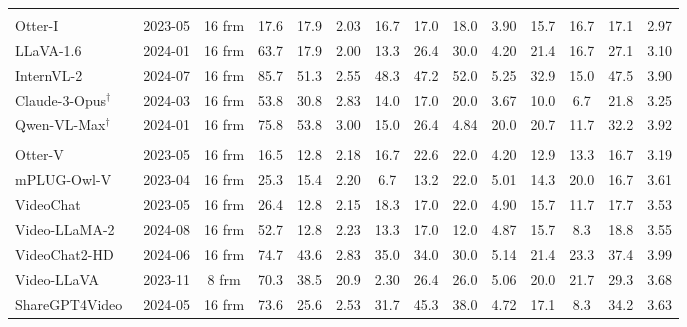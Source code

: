 \begin{table*}[t]
{\begin{tabular}{lccccccccccccc}
\hline
 \rowcolor[HTML]{E3F8F8}\multicolumn{14}{l}{\gray{\textit{\textbf{Image MLLMs}}}}\\
 \rowcolor[HTML]{E3F8F8}  Otter-I~\cite{otter2023} &2023-05 &16 frm  & 17.6 & 17.9 &2.03   & 16.7  & 17.0  & 18.0 &3.90 & 15.7 & 16.7 & 17.1 & 2.97 \\
          \rowcolor[HTML]{E3F8F8}LLaVA-1.6~\cite{llava2023} &2024-01 &16 frm  & 63.7 & 17.9  & 2.00  & 13.3  & 26.4  & 30.0 &4.20   & 21.4 & 16.7 & 27.1 & 3.10 \\
         \rowcolor[HTML]{E3F8F8} InternVL-2~\cite{internvl-1.5-2024} &2024-07 &16 frm & 85.7 & 51.3 & 2.55  & 48.3  & 47.2  & 52.0  & 5.25  & 32.9 & 15.0 & 47.5 & 3.90   \\
         \rowcolor[HTML]{E3F8F8} Claude-3-Opus$^\dag$~\cite{Claude3} &2024-03 &16 frm  & 53.8 & 30.8 & 2.83  & 14.0  & 17.0  & 20.0  & 3.67  & 10.0 & 6.7  & 21.8 & 3.25  \\
        \rowcolor[HTML]{E3F8F8} Qwen-VL-Max$^\dag$~\cite{qwenvl-2023} &2024-01 &16 frm  & 75.8 & 53.8 & 3.00  & 15.0  & 26.4  & 4.84  & 20.0  & 20.7 & 11.7 & 32.2 & 3.92  \\
        \hline
         \rowcolor[HTML]{FFF5F5}\multicolumn{14}{l}{\gray{\textit{\textbf{Short Video MLLMs}}}} \\
        \rowcolor[HTML]{FFF5F5}Otter-V~\cite{otter2023} &2023-05  &16 frm  & 16.5 & 12.8 & 2.18  & 16.7  & 22.6  & 22.0  & 4.20   & 12.9 & 13.3 & 16.7 & 3.19  \\
        \rowcolor[HTML]{FFF5F5}mPLUG-Owl-V~\cite{mplug-owl-2023} &2023-04  &16 frm  & 25.3 & 15.4 & 2.20  & 6.7   & 13.2  & 22.0  & 5.01  & 14.3 & 20.0 & 16.7 & 3.61 \\
         \rowcolor[HTML]{FFF5F5}VideoChat~\cite{videochat2023} &2023-05 &16 frm   & 26.4 & 12.8 & 2.15  & 18.3  & 17.0  & 22.0  & 4.90  & 15.7 & 11.7 & 17.7 & 3.53  \\
        \rowcolor[HTML]{FFF5F5}Video-LLaMA-2~\cite{videollama} &2024-08  &16 frm  & 52.7 & 12.8 & 2.23  & 13.3  & 17.0  & 12.0  & 4.87  & 15.7 & 8.3  & 18.8 & 3.55  \\
         \rowcolor[HTML]{FFF5F5}VideoChat2-HD~\cite{mvbench2023} &2024-06 &16 frm  & 74.7 & 43.6 & 2.83  & 35.0  & 34.0  & 30.0  & 5.14  & 21.4 & 23.3 & 37.4 & 3.99  \\
          \rowcolor[HTML]{FFF5F5}Video-LLaVA~\cite{videollava2023}  &2023-11 &8 frm  & 70.3 & 38.5 & 20.9  & 2.30  & 26.4  & 26.0  & 5.06  & 20.0 & 21.7 & 29.3 & 3.68  \\
            \rowcolor[HTML]{FFF5F5}ShareGPT4Video~\cite{chen2024sharegpt4video} &2024-05 &16 frm  & 73.6 & 25.6 & 2.53  & 31.7  & 45.3  & 38.0  & 4.72  & 17.1 & 8.3  & 34.2 & 3.63  \\

\end{tabular}}
\end{table*}
